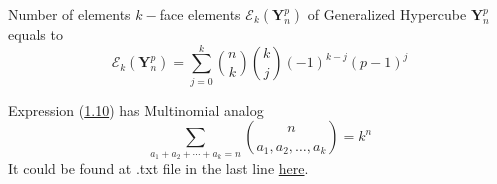 \begin{lem}
    Number of elements $k-$face elements $\mathscr{E}_k(\mathrm{\mathbf{Y}}_n^p)$ of Generalized Hypercube $\mathrm{\mathbf{Y}}_n^p$ equals to
    \begin{equation}
        \label{l1}
        \mathscr{E}_k(\mathrm{\mathbf{Y}}_n^p)=\sum_{j=0}^{k}\binom{n}{k}\binom{k}{j}(-1)^{k-j}(p-1)^j
    \end{equation}
\end{lem}
Expression (\hyperref[hyp8]{1.10}) has Multinomial analog
\begin{equation}
    \label{m1}
    \sum_{a_1+a_2+\cdots+a_k=n}\binom{n}{a_1,a_2,\ldots,a_k}=k^n
\end{equation}
It could be found at .txt file in the last line \href{https://kolosovpetro.github.io/mathematica_codes/Series_Representation_Mathematica_codes.txt}{here}.